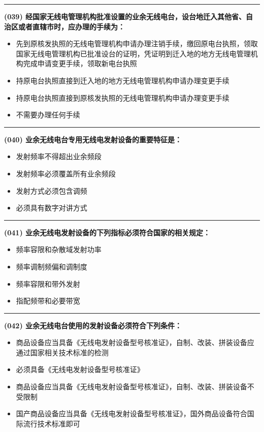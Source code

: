 \documentclass[twocolumn]{ctexart}  %
\begin{document}
\noindent\rule{0.5\textwidth}{1pt}
\heiti \textbf{(039) 经国家无线电管理机构批准设置的业余无线电台，设台地迁入其他省、自治区或者直辖市时，应办理的手续为：} \songti {\color{gray} [LK0090] }
\begin{itemize}
	\item  先到原核发执照的无线电管理机构申请办理注销手续，缴回原电台执照，领取国家无线电管理机构已批准设台的证明，凭证明到迁入地的地方无线电管理机构完成申请变更手续，领取新电台执照
	\item  持原电台执照直接到迁入地的地方无线电管理机构申请办理变更手续
	\item  持原电台执照直接到原核发执照的无线电管理机构申请办理变更手续
	\item  不需要办理任何手续
\end{itemize}


\noindent\rule{0.5\textwidth}{1pt}
\heiti \textbf{(040) 业余无线电台专用无线电发射设备的重要特征是：} \songti {\color{gray} [LK0024] }
\begin{itemize}
	\item  发射频率不得超出业余频段
	\item  发射频率必须覆盖所有业余频段
	\item  发射方式必须包含调频
	\item  必须具有数字对讲方式
\end{itemize}


\noindent\rule{0.5\textwidth}{1pt}
\heiti \textbf{(041) 业余无线电发射设备的下列指标必须符合国家的相关规定：} \songti {\color{gray} [LK0025] }
\begin{itemize}
	\item  频率容限和杂散域发射功率
	\item  频率调制频偏和调制度
	\item  频率容限和带外发射
	\item  指配频带和必要带宽
\end{itemize}


\noindent\rule{0.5\textwidth}{1pt}
\heiti \textbf{(042) 业余无线电台使用的发射设备必须符合下列条件：} \songti {\color{gray} [LK0038] }
\begin{itemize}
	\item  商品设备应当具备《无线电发射设备型号核准证》，自制、改装、拼装设备应通过国家相关技术标准的检测
	\item  必须具备《无线电发射设备型号核准证》
	\item  商品设备应当具备《无线电发射设备型号核准证》，自制、改装、拼装设备不受限制
	\item  国产商品设备应当具备《无线电发射设备型号核准证》，国外商品设备符合国际流行技术标准即可
\end{itemize}
\end{document}

